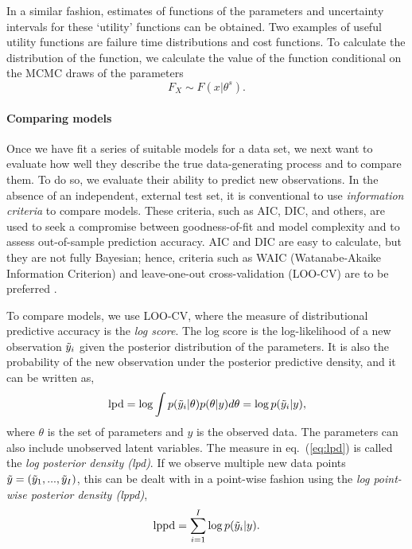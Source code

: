 In a similar fashion, estimates of functions of the parameters and uncertainty intervals for these `utility' functions can be obtained. Two examples of useful utility functions are failure time distributions and cost functions. To calculate the distribution of the function, we calculate the value of the function conditional on the MCMC draws of the parameters
\begin{equation}
 F_{X} \sim F(x|\theta^s).
\end{equation}

\paragraph*{Comparing models}

Once we have fit a series of suitable models for a data set, we next want to evaluate how well they describe the true data-generating process and to compare them. To do so, we evaluate their ability to predict new observations. In the absence of an independent, external test set, it is conventional to use \textit{information criteria} to compare models. These criteria, such as AIC, DIC, and others, are used to seek a compromise between goodness-of-fit and model complexity and to assess out-of-sample prediction accuracy. AIC and DIC are easy to calculate, but they are not fully Bayesian; hence, criteria such as WAIC (Watanabe-Akaike Information Criterion) and leave-one-out cross-validation (LOO-CV) are to be preferred \citep{Vehtari2017}.

To compare models, we use LOO-CV, where the measure of distributional predictive accuracy is the \emph{log score}. The log score is the log-likelihood of a new observation $\Tilde{y}_i$ given the posterior distribution of the parameters. It is also the probability of the new observation under the posterior predictive density, and it can be written as,
\begin{equation} \label{eq:lpd}
 \hbox{lpd} = \log \int p(\Tilde{y}_i|\theta)p(\theta|y)d\theta = \log p(\Tilde{y}_i | y),
\end{equation}
where $\theta$ is the set of parameters and $y$ is the observed data. The parameters can also include unobserved latent variables. The measure in eq.~(\ref{eq:lpd}) is called the \textit{log posterior density (lpd)}. If we observe multiple new data points $\Tilde{y} = (\Tilde{y}_1, ..., \Tilde{y}_I)$, this can be dealt with in a point-wise fashion using the \textit{log point-wise posterior density (lppd)},
\begin{equation} \label{eq:lppd}
 \hbox{lppd} = \sum^I_{i = 1} \log p(\Tilde{y}_i|y).
\end{equation}

